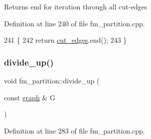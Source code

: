 \begin{DoxyReturn}{Returns}
end for iteration through all cut-\/edges 
\end{DoxyReturn}


Definition at line 240 of file fm\+\_\+partition.\+cpp.


\begin{DoxyCode}
241 \{
242     \textcolor{keywordflow}{return} \mbox{\hyperlink{classfm__partition_ad71b58a8f73cc834d49304252fb4a288}{cut\_edges}}.end();
243 \}
\end{DoxyCode}
\mbox{\label{classfm__partition_ad768579b813500dc2d267aac5668ed48}} 
\subsubsection{\texorpdfstring{divide\+\_\+up()}{divide\_up()}}
{\footnotesize\ttfamily void fm\+\_\+partition\+::divide\+\_\+up (\begin{DoxyParamCaption}\item[{const \mbox{\hyperlink{classgraph}{graph}} \&}]{G }\end{DoxyParamCaption})\hspace{0.3cm}{\ttfamily [protected]}}



Definition at line 283 of file fm\+\_\+partition.\+cpp.


